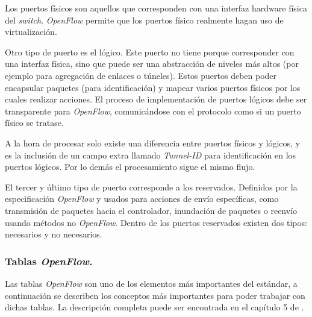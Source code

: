 \documentclass[a4paper,11pt]{book}
\begin{document}
Los puertos físicos son aquellos que corresponden con una interfaz hardware física del \textit{switch}. \emph{OpenFlow} permite que los puertos físico realmente hagan uso de virtualización.

Otro tipo de puerto es el lógico. Este puerto no tiene porque corresponder con una interfaz física, sino que puede ser una abstracción de niveles más altos (por ejemplo para agregación de enlaces o túneles). Estos puertos deben poder encapsular paquetes (para identificación) y mapear varios puertos físicos por los cuales realizar acciones. El proceso de implementación de puertos lógicos debe ser transparente para \emph{OpenFlow}, comunicándose con el protocolo como si un puerto físico se tratase. 

A la hora de procesar solo existe una diferencia entre puertos físicos y lógicos, y es la inclusión de un campo extra llamado \textit{Tunnel-ID} para identificación en los puertos lógicos. Por lo demás el procesamiento sigue el mismo flujo.

El tercer y último tipo de puerto corresponde a los reservados. Definidos por la especificación \emph{OpenFlow} y usados para acciones de envío específicas, como transmisión de paquetes hacia el controlador, inundación de paquetes o reenvío usando métodos no \emph{OpenFlow}. Dentro de los puertos reservados existen dos tipos: necesarios y no necesarios.

\subsubsection{Tablas \emph{OpenFlow}.}\label{openFlowTables} Las tablas \emph{OpenFlow} son uno de los elementos más importantes del estándar, a continuación se describen los conceptos más importantes para poder trabajar con dichas tablas. La descripción completa puede ser encontrada en el capítulo 5 de \cite{openflow13}. 
\end{document}
